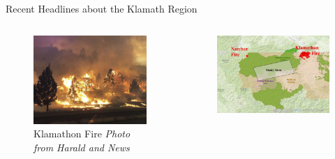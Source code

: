 \documentclass[xcolor=dvipsnames]{beamer}
\begin{document}
\begin{frame}{Recent Headlines about the Klamath Region}
\begin{center}
\begin{columns}
    \begin{column}{0.4\textwidth}
\begin{figure}
\centering\includegraphics[width=.85\linewidth]{klamathFire_herald_and_news.jpg}
\caption*{{\hspace*{1.3cm}Klamathon Fire} \newline \tiny\textit{\hspace*{1.25cm}Photo from Harald and News}}
\end{figure}
    \end{column}
    \begin{column}{0.6\textwidth}
  \begin{figure}
\vspace*{-.5cm}
\centering\includegraphics[width=.85\linewidth]{firemap2.png}

\end{figure}
    \end{column}
\end{columns}
\end{center}

\end{frame}
\end{document}
